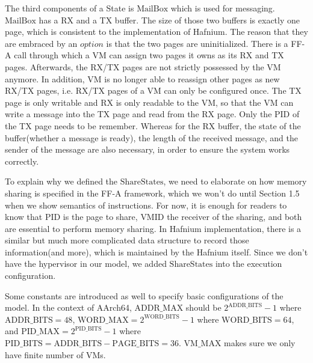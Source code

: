 \documentclass[a4paper]{article}
\newcommand*{\SSS}{\text{ShareStates}}
\newcommand*{\PID}{\text{PID}}
\newcommand*{\VMID}{\text{VMID}}
\newcommand*{\MB}{\text{MailBox}}
\newcommand*{\PABITS}{\text{ADDR\_BITS}}
\newcommand*{\PPBITS}{\text{PAGE\_BITS}}
\newcommand*{\PPIDBITS}{\text{PID\_BITS}}
\newcommand*{\PAMAX}{\text{ADDR\_MAX}}
\newcommand*{\PPIDMAX}{\text{PID\_MAX}}
\newcommand*{\PWBITS}{\text{WORD\_BITS}}
\newcommand*{\PWMAX}{\text{WORD\_MAX}}
\newcommand*{\PVMMAX}{\text{VM\_MAX}}
\begin{document}
The third components of a State is $\MB$ which is used for messaging. $\MB$ has
a RX and a TX buffer. The size of those two buffers is exactly one page, which
is consistent to the implementation of Hafnium. The reason that they are
embraced by an $option$ is that the two pages are uninitialized. There is a FF-A
call through which a VM can assign two pages it owns as its RX and TX pages.
Afterwards, the RX/TX pages are not strictly possessed by the VM anymore. In
addition, VM is no longer able to reassign other pages as new RX/TX pages, i.e.
RX/TX pages of a VM can only be configured once. The TX page is only writable
and RX is only readable to the VM, so that the VM can write a message into the
TX page and read from the RX page. Only the $\PID$ of the TX page needs to be
remember. Whereas for the RX buffer, the state of the buffer(whether a message
is ready), the length of the received message, and the sender of the message are
also necessary, in order to ensure the system works correctly.

To explain why we defined the $\SSS$, we need to elaborate on how memory sharing is
specified in the FF-A framework, which we won't do until Section 1.5 when we
show semantics of instructions. For now, it is enough for readers to know that $\PID$ is
the page to share, $\VMID$ the receiver of the sharing, and both are essential
to perform memory sharing. In Hafnium implementation, there is a similar but
much more complicated data structure to record those information(and more),
which is maintained by the Hafnium itself. Since we don't have the hypervisor in
our model, we added $\SSS$ into the execution configuration.

Some constants are introduced as well to specify basic configurations of the model. In
the context of AArch64, $\PAMAX$ should be $2^{\PABITS} - 1$ where
$\PABITS = 48$, $\PWMAX = 2^{\PWBITS} -1$ where $\PWBITS = 64$, and
$\PPIDMAX = 2^{\PPIDBITS}-1$ where $\PPIDBITS = \PABITS - \PPBITS = 36$.
$\PVMMAX$ makes sure we only have finite number of VMs.
\end{document}
